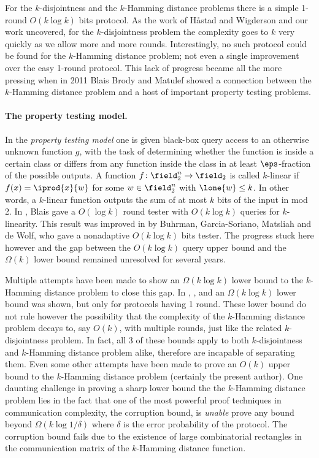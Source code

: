 For the $k$-disjointness and the $k$-Hamming distance problems 
there is a simple 1-round $O(k \log k)$ bits protocol.  As the work of 
Håstad and Wigderson and our work uncovered, for the $k$-disjointness problem 
the complexity goes to $k$ very quickly as we allow more and more rounds.
Interestingly, no such protocol could be found for the $k$-Hamming distance problem;
not even a single improvement over the easy 1-round protocol.
This lack of progress became all the more pressing when in 2011 
Blais Brody and Matulef \cite{BlaisBM2012} showed a connection between
the $k$-Hamming distance problem and a host of important property testing problems.

\paragraph{The property testing model.}
In the {\em property testing model} one is given black-box query access 
to an otherwise unknown function $g$, with the task of determining
whether the function is inside a certain class or differs from any function inside 
the class in at least $\eps$-fraction of the possible outputs.
A function $f\colon\field_2^n\to\field_2$ is called $k$-linear if $f(x)=\iprod{x}{w}$
for some $w\in\field_2^n$ with $\lone{w}\le k$. In other words, a $k$-linear function 
outputs the sum of at most $k$ bits of the input in mod 2. 
In \cite{Blais2009}, Blais gave a $O(\log k)$ round tester with $O(k\log k)$ 
queries for $k$-linearity. This result was improved in \cite{BuhrmanGMW2012} by Buhrman, Garcia-Soriano, Matsliah and
de Wolf, who gave a nonadaptive $O(k\log k)$ bits tester. The progress stuck here however  and the gap between the $O(k\log k)$ query upper bound and the $\Omega(k)$ lower bound remained unresolved for several years.

Multiple attempts have been made to show an $\Omega(k\log k)$ lower bound to the $k$-Hamming distance problem
to close this gap. In \cite{BuhrmanGMW2012}, \cite{DasguptaKS2012}, and \cite{Patrascu2009} an $\Omega(k\log k)$ lower bound was shown, but only for protocols
having 1 round. These lower bound do not rule however the possibility that the complexity of the $k$-Hamming distance problem
decays to, say $O(k)$, with multiple rounds, just like the related $k$-disjointness problem.
In fact, all 3 of these bounds apply to both $k$-disjointness and $k$-Hamming distance problem alike, 
therefore are incapable of separating them.
Even some other attempts have been made to prove an 
$O(k)$ upper bound to the $k$-Hamming distance problem (certainly the present author).
One daunting challenge in proving a sharp lower bound the the $k$-Hamming distance problem
lies in the fact that one of the most powerful proof techniques in communication complexity, the corruption
bound, is {\em unable} prove any bound beyond $\Omega(k\log 1/\delta)$ where $\delta$ is the error probability of the protocol.
The corruption bound fails due to the existence of large combinatorial rectangles in the communication matrix of the $k$-Hamming distance
function.

